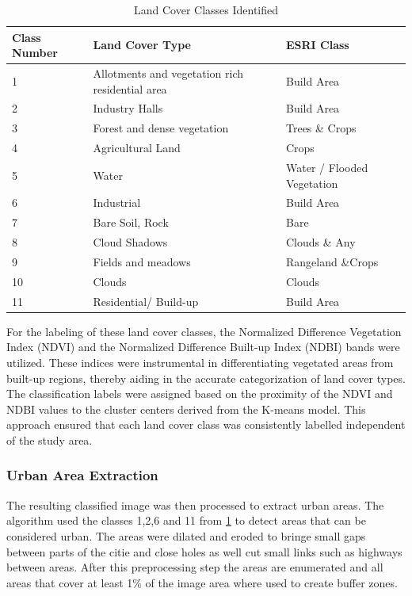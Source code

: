 \documentclass[12pt,a4paper, english]{article}
\begin{document}
\begin{table}[h]
\centering
\caption{Land Cover Classes Identified\label{tab:land_cover_classes}}
\begin{tabular}{lp{4cm}l}
\toprule
\textbf{Class Number} & \textbf{Land Cover Type} & \textbf{ESRI Class}\\
\midrule
1 &  Allotments and vegetation rich residential area  & Build Area\\
2 &  Industry Halls & Build Area\\
3 &  Forest and dense vegetation& Trees \& Crops\\
4 &  Agricultural Land & Crops\\
5 &  Water& Water / Flooded Vegetation\\
6 &  Industrial& Build Area\\
7 &  Bare Soil, Rock & Bare \\
8 &  Cloud Shadows & Clouds \& Any \\
9 &  Fields and meadows& Rangeland \&Crops \\
10 &  Clouds & Clouds \\
11 &  Residential/ Build-up& Build Area\\
\bottomrule
\end{tabular}
\end{table}
For the labeling of these land cover classes, the Normalized Difference Vegetation Index (NDVI) and the Normalized Difference Built-up Index (NDBI) bands were utilized.
These indices were instrumental in differentiating vegetated areas from built-up regions, thereby aiding in the accurate categorization of land cover types.
The classification labels were assigned based on the proximity of the NDVI and NDBI values to the cluster centers derived from the K-means model.
This approach ensured that each land cover class was consistently labelled independent of the study area.\\
%
\subsubsection{Urban Area Extraction}
    The resulting classified image was then processed to extract urban areas.
    The algorithm used the classes 1,2,6 and 11 from \cref{tab:land_cover_classes} to detect areas that can be considered urban.
    The areas were \gls{dilated} and \gls{eroded} to bringe small gaps between parts of the citie and close holes as well cut small links such as highways between areas.
    After this preprocessing step the areas are enumerated and all areas that cover at least 1\% of the image area where used to create buffer zones. 
\end{document}
